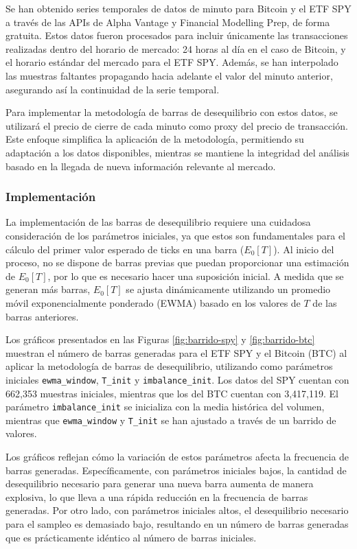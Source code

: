 \documentclass[a4paper,12pt, twoside]{report}
\begin{document}
Se han obtenido series temporales de datos de minuto para Bitcoin y el ETF SPY a través de las APIs de Alpha Vantage y 
Financial Modelling Prep, de forma gratuita. Estos datos fueron procesados para incluir únicamente las transacciones 
realizadas dentro del horario de mercado: 24 horas al día en el caso de Bitcoin, y el horario estándar del mercado para 
el ETF SPY. Además, se han interpolado las muestras faltantes propagando hacia adelante el valor del minuto anterior, 
asegurando así la continuidad de la serie temporal.

Para implementar la metodología de barras de desequilibrio con estos datos, se utilizará el precio de cierre de cada minuto 
como proxy del precio de transacción. Este enfoque simplifica la aplicación de la metodología, permitiendo su adaptación a 
los datos disponibles, mientras se mantiene la integridad del análisis basado en la llegada de nueva información relevante 
al mercado.
\subsubsection{Implementación}
La implementación de las barras de desequilibrio requiere una cuidadosa consideración de los parámetros iniciales, 
ya que estos son fundamentales para el cálculo del primer valor esperado de ticks en una barra (\(E_0[T]\)). Al inicio 
del proceso, no se dispone de barras previas que puedan proporcionar una estimación de \(E_0[T]\), por lo que es necesario 
hacer una suposición inicial. A medida que se generan más barras, \(E_0[T]\) se ajusta dinámicamente utilizando un promedio móvil exponencialmente 
ponderado (EWMA) basado en los valores de \(T\) de las barras anteriores.

Los gráficos presentados en las Figuras \ref{fig:barrido-spy} y \ref{fig:barrido-btc} muestran el número de barras 
generadas para el ETF SPY y el Bitcoin (BTC) al aplicar la metodología de barras de desequilibrio, utilizando como 
parámetros iniciales \texttt{ewma\_window}, \texttt{T\_init} y \texttt{imbalance\_init}. Los datos del SPY cuentan 
con 662,353 muestras iniciales, mientras que los del BTC cuentan con 3,417,119. El parámetro \texttt{imbalance\_init} 
se inicializa con la media histórica del volumen, mientras que \texttt{ewma\_window} y \texttt{T\_init} se han ajustado 
a través de un barrido de valores. 

Los gráficos reflejan cómo la variación de estos parámetros afecta la frecuencia de barras 
generadas. Específicamente, con parámetros iniciales bajos, la cantidad de desequilibrio necesario para generar una 
nueva barra aumenta de manera explosiva, lo que lleva a una rápida reducción en la frecuencia de barras generadas. 
Por otro lado, con parámetros iniciales altos, el desequilibrio necesario para el sampleo es demasiado bajo, 
resultando en un número de barras generadas que es prácticamente idéntico al número de barras iniciales. 
\end{document}
